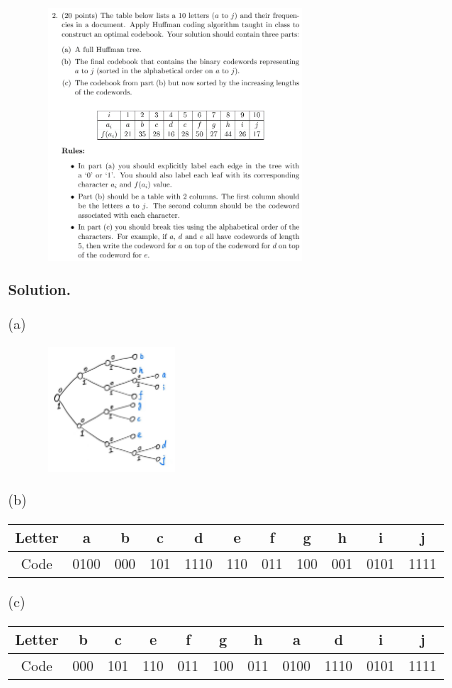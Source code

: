 \documentclass[10pt]{article}
\begin{document}
\begin{figure}[h]
	\centering
	\includegraphics[width=0.6\textwidth]{hw3-2}
\end{figure}

\textbf{Solution.}

(a)
\begin{figure}[h]
	\centering
	\includegraphics[width=0.3\textwidth]{hw3-2-ans}
\end{figure}

(b)
\begin{center}
	\renewcommand{\arraystretch}{1.5}
	\begin{tabular}{|c|c|c|c|c|c|c|c|c|c|c|}
		\hline
		Letter & a & b & c & d & e & f & g & h & i & j \\
		\hline
		Code & 0100 & 000 & 101 & 1110 & 110 & 011 & 100 & 001 & 0101 & 1111 \\
		\hline
	\end{tabular}
\end{center}

(c)
\begin{center}
	\renewcommand{\arraystretch}{1.5}
	\begin{tabular}{|c|c|c|c|c|c|c|c|c|c|c|}
		\hline
		Letter & b & c & e & f & g & h & a & d & i & j \\
		\hline
		Code & 000 & 101 & 110 & 011 & 100 & 011 & 0100 & 1110 & 0101 & 1111 \\
		\hline
	\end{tabular}
\end{center}
\end{document}
